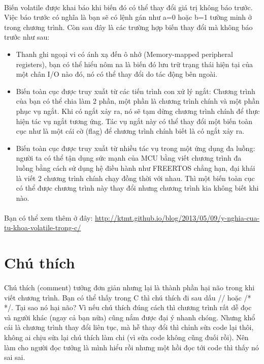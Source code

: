 \documentclass[12pt,a5paper]{book}
\begin{document}
\paragraph{}
Biến volatile được khai báo khi biến đó có thể thay đổi giá trị không báo trước. Việc báo trước có nghĩa là bạn sẽ có lệnh gán như a=0 hoặc b=1 tường minh ở trong chương trình. Còn sau đây là các trường hợp biến thay đổi mà không báo trước như sau:
\begin{itemize}
\item Thanh ghi ngoại vi có ánh xạ đến ô nhớ (Memory-mapped peripheral registers), bạn có thể hiểu nôm na là biến đó lưu trữ trạng thái hiện tại của một chân I/O nào đó, nó có thể thay đổi do tác động bên ngoài.
\item Biến toàn cục được truy xuất từ các tiến trình con xử lý ngắt: Chương trình của bạn có thể chia làm 2 phần, một phần là chương trình chính và một phần phục vụ ngắt. Khi có ngắt xảy ra, nó sẽ tạm dừng chương trình chính để thực hiện tác vụ ngắt tương ứng. Tác vụ ngắt này có thể thay đổi một biến toàn cục như là một cái cờ (flag) để chương trình chính biết là có ngắt xảy ra.
\item Biến toàn cục được truy xuất từ nhiều tác vụ trong một ứng dụng đa luồng: người ta có thể tận dụng sức mạnh của MCU bằng viết chương trình đa luồng bằng cách sử dụng hệ điều hành như FREERTOS chẳng hạn, đại khái là viết 2 chương trình chính chạy đồng thời với nhau. Thì một biến toàn cục có thể được chương trình này thay đổi nhưng chương trình kia không biết khi nào.
\end{itemize}
\paragraph{}
Bạn có thể xem thêm ở đây: \url{http://ktmt.github.io/blog/2013/05/09/y-nghia-cua-tu-khoa-volatile-trong-c/}
\section{Chú thích}
\paragraph{}
Chú thích (comment) tưởng đơn giản nhưng lại là thành phần hại não trong khi viết chương trình. Bạn có thể thấy trong C thì chú thích đi sau dấu // hoặc /* */. Tại sao nó hại não? Vì nếu chú thích đúng cách thì chương trình rất dễ đọc và người khác (ngay cả bạn nữa) cũng nắm được đại ý nhanh chóng. Nhưng khổ cái là chương trình thay đổi liên tục, mà hễ thay đổi thì chỉnh sửa code lại thôi, không ai chịu sửa lại chú thích làm chi (vì sửa code không cũng đuối rồi). Nên làm cho người đọc tưởng là mình hiểu rồi nhưng một hồi đọc tới code thì thấy nó sai sai.
\end{document}
